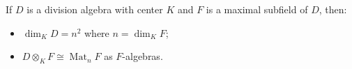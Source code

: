 If $D$ is a division algebra with center $K$ and $F$ is a maximal subfield of $D$, then:
\begin{itemize}
\item[(i)] $\dim_K D = n^2$ where $n = \dim_K F$;
\item[(ii)] $D \otimes_K F \cong \operatorname{Mat}_n F$ as $F$-algebras.
\end{itemize}
